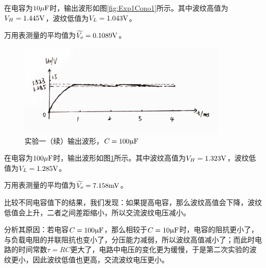 \documentclass[a4paper,11pt,UTF8]{ctexart}
\begin{document}
在电容为$10\mathrm{\mu F}$时，输出波形如图\ref{fig:Exp1Cono1}所示。其中波纹高值为$V_H=1.445\mathrm{V}$，波纹低值为$V_L=1.043\mathrm{V}$。
\par 万用表测量的平均值为$\widetilde{V_o}=0.1089\mathrm{V}$。
\begin{figure}[H]
 \centering
 \includegraphics[width=10cm]{Exp1Cono2}
 \caption{实验一（续）输出波形，$C=100\mathrm{\upmu F}$}
 \label{fig:Exp1Cono2}
\end{figure}
在电容为$100\mathrm{\mu F}$时，输出波形如图\ref{fig:Exp1Cono2}所示。其中波纹高值为$V_H=1.323\mathrm{V}$，波纹低值为$V_L=1.285\mathrm{V}$。
\par 万用表测量的平均值为$\widetilde{V_o}=7.158\mathrm{mV}$。
\par 比较不同电容值下的结果，我们发现：如果提高电容，那么波纹高值会下降，波纹低值会上升，二者之间差距缩小，所以交流波纹电压减小。
\par 分析其原因：若电容$C=100\mathrm{\upmu F}$，那么相较于$C=10\mathrm{\upmu F}$时，电容的阻抗更小了，与负载电阻的并联阻抗也变小了，分压能力减弱，所以波纹高值减小了；而此时电路的时间常数$\tau=RC$更大了，电路中电压的变化更为缓慢，于是第二次实验的波纹更小，因此波纹低值也更高，交流波纹电压更小。
\end{document}
